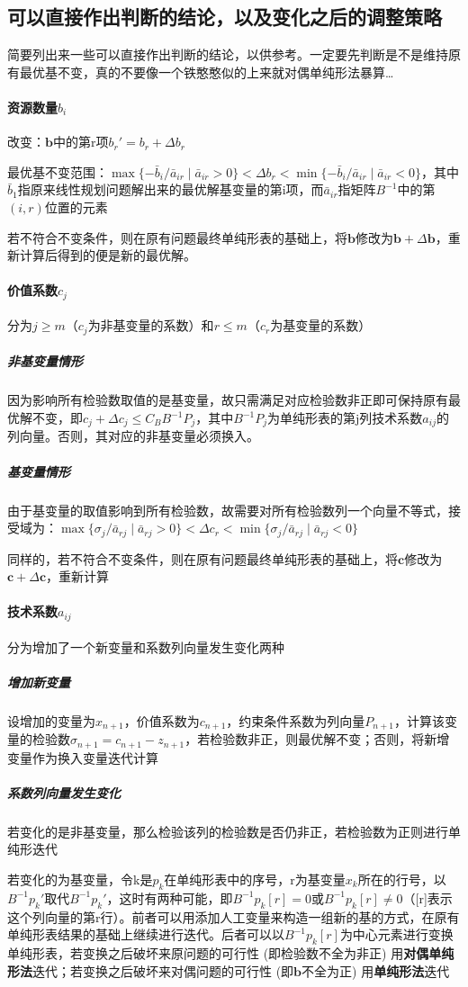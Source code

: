 \documentclass[]{report}
\begin{document}
		\subsection{可以直接作出判断的结论，以及变化之后的调整策略}
		简要列出来一些可以直接作出判断的结论，以供参考。一定要先判断是不是维持原有最优基不变，真的不要像一个铁憨憨似的上来就对偶单纯形法暴算\dots
			\paragraph{资源数量$b_i$}\par
			改变：$\boldsymbol{b}$中的第r项$b_r'=b_r+\Delta b_r$\par
			最优基不变范围：$\max\{-\bar{b}_i/\bar{a}_{ir}\mid\bar{a}_{ir}>0\}<\Delta b_r<\min\{-\bar{b}_i/\bar{a}_{ir}\mid\bar{a}_{ir}<0\}$，其中$\bar{b}_1$指原来线性规划问题解出来的最优解基变量的第i项，而$\bar{a}_{ir}$指矩阵$B^{-1}$中的第$(i,r)$位置的元素\par
			若不符合不变条件，则在原有问题最终单纯形表的基础上，将$\boldsymbol{b}$修改为$\boldsymbol{b}+\Delta\boldsymbol{b}$，重新计算后得到的便是新的最优解。

			\paragraph{价值系数$c_j$}\par
			分为$j\ge m$（$c_j$为非基变量的系数）和$r\le m$（$c_r$为基变量的系数）\par
			\subparagraph{非基变量情形}
			因为影响所有检验数取值的是基变量，故只需满足对应检验数非正即可保持原有最优解不变，即$c_j+\Delta c_j\le C_BB^{-1}P_j$，其中$B^{-1}P_j$为单纯形表的第j列技术系数$a_{ij}$的列向量。否则，其对应的非基变量必须换入。
			\subparagraph{基变量情形}
			由于基变量的取值影响到所有检验数，故需要对所有检验数列一个向量不等式，接受域为：$\max\{\sigma_j/\bar{a}_{rj}\mid\bar{a}_{rj}>0\}<\Delta c_r<\min\{\sigma_j/\bar{a}_{rj}\mid\bar{a}_{rj}<0\}$\par
			同样的，若不符合不变条件，则在原有问题最终单纯形表的基础上，将$\boldsymbol{c}$修改为$\boldsymbol{c}+\Delta\boldsymbol{c}$，重新计算

			\paragraph{技术系数$a_{ij}$}
			分为增加了一个新变量和系数列向量发生变化两种
			\subparagraph{增加新变量}
			设增加的变量为$x_{n+1}$，价值系数为$c_{n+1}$，约束条件系数为列向量$P_{n+1}$，计算该变量的检验数$\sigma_{n+1}=c_{n+1}-z_{n+1}$，若检验数非正，则最优解不变；否则，将新增变量作为换入变量迭代计算
			\subparagraph{系数列向量发生变化}
			若变化的是非基变量，那么检验该列的检验数是否仍非正，若检验数为正则进行单纯形迭代\par
			若变化的为基变量，令k是$p_k$在单纯形表中的序号，r为基变量$x_k$所在的行号，以$B^{-1}p_k'$取代$B^{-1}p_k'$，这时有两种可能，即$B^{-1}p_k[r]=0$或$B^{-1}p_k[r]\neq0$（[r]表示这个列向量的第r行）。前者可以用添加人工变量来构造一组新的基的方式，在原有单纯形表结果的基础上继续进行迭代。后者可以以$B^{-1}p_k[r]$为中心元素进行变换单纯形表，若变换之后破坏来原问题的可行性 (即检验数不全为非正) 用\textbf{对偶单纯形法}迭代；若变换之后破坏来对偶问题的可行性 (即$\boldsymbol{b}$不全为正) 用\textbf{单纯形法}迭代
\end{document}
